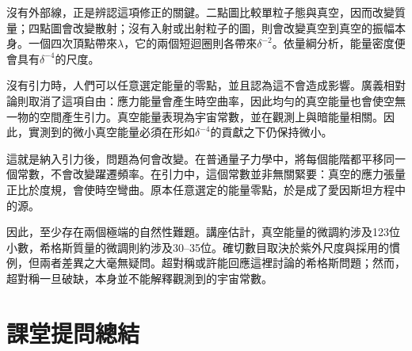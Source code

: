 沒有外部線，正是辨認這項修正的關鍵。二點圖比較單粒子態與真空，因而改變質量；四點圖會改變散射；沒有入射或出射粒子的圖，則會改變真空到真空的振幅本身。一個四次頂點帶來\(\lambda\)，它的兩個短迴圈則各帶來\(\delta^{-2}\)。依量綱分析，能量密度便會具有\(\delta^{-4}\)的尺度。

沒有引力時，人們可以任意選定能量的零點，並且認為這不會造成影響。廣義相對論則取消了這項自由：應力能量會產生時空曲率，因此均勻的真空能量也會使空無一物的空間產生引力。真空能量表現為宇宙常數，並在觀測上與暗能量相關。因此，實測到的微小真空能量必須在形如\(\delta^{-4}\)的貢獻之下仍保持微小。

這就是納入引力後，問題為何會改變。在普通量子力學中，將每個能階都平移同一個常數，不會改變躍遷頻率。在引力中，這個常數並非無關緊要：真空的應力張量正比於度規，會使時空彎曲。原本任意選定的能量零點，於是成了愛因斯坦方程中的源。

因此，至少存在兩個極端的自然性難題。講座估計，真空能量的微調約涉及123位小數，希格斯質量的微調則約涉及30--35位。確切數目取決於紫外尺度與採用的慣例，但兩者差異之大毫無疑問。超對稱或許能回應這裡討論的希格斯問題；然而，超對稱一旦破缺，本身並不能解釋觀測到的宇宙常數。

\section{課堂提問總結}

\begin{classroomqa}
\end{classroomqa}

\begin{classroomqa}
\end{classroomqa}

